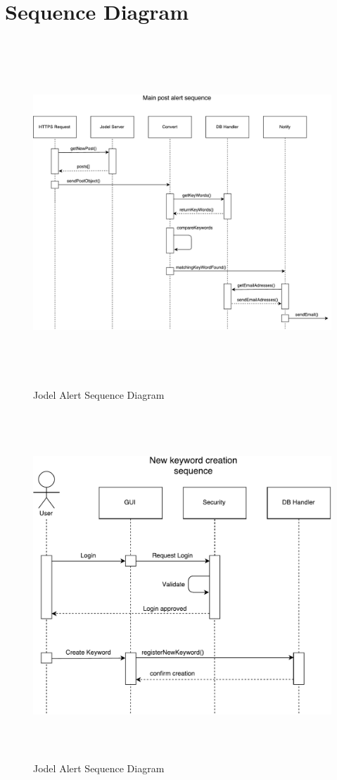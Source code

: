 \documentclass[a4paper,12pt]{article}
\begin{document}
\section{Sequence Diagram}
\begin{figure}[!h]
	\centering
	\includegraphics[height=13cm]{img/sequence_diagram1.pdf}
	\caption{Jodel Alert Sequence Diagram}
	\label{Jodel}
\end{figure}
\clearpage
\begin{figure}[!h]
	\centering
	\includegraphics[height=13cm]{img/sequence_diagram2.pdf}
	\caption{Jodel Alert Sequence Diagram}
	\label{Jodel}
\end{figure}
\clearpage
\end{document}
